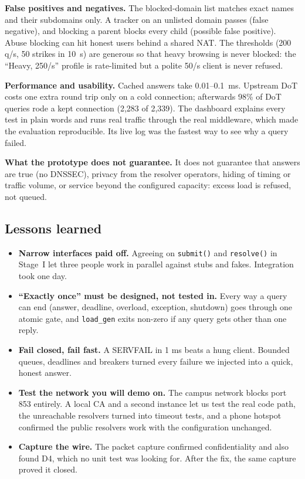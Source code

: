 \documentclass[11pt,a4paper]{article}
\newcommand{\code}[1]{\texttt{#1}}
\begin{document}
\textbf{False positives and negatives.} The blocked-domain list matches exact names and their subdomains only.
A tracker on an unlisted domain passes (false negative), and blocking a parent blocks every child (possible
false positive). Abuse blocking can hit honest users behind a shared NAT. The thresholds (200 q/s, 50 strikes
in 10~s) are generous so that heavy browsing is never blocked: the ``Heavy, 250/s'' profile is rate-limited
but a polite 50/s client is never refused.

\textbf{Performance and usability.} Cached answers take 0.01--0.1~ms. Upstream DoT costs one extra round trip
only on a cold connection; afterwards 98\% of DoT queries rode a kept connection (2{,}283 of 2{,}339). The
dashboard explains every test in plain words and runs real traffic through the real middleware, which made the
evaluation reproducible. Its live log was the fastest way to see why a query failed.

\textbf{What the prototype does not guarantee.} It does not guarantee that answers are true (no DNSSEC), privacy
from the resolver operators, hiding of timing or traffic volume, or service beyond the configured capacity:
excess load is refused, not queued.

\subsection{Lessons learned}
\begin{itemize}
  \item \textbf{Narrow interfaces paid off.} Agreeing on \code{submit()} and \code{resolve()} in Stage~I let
  three people work in parallel against stubs and fakes. Integration took one day.
  \item \textbf{``Exactly once'' must be designed, not tested in.} Every way a query can end (answer, deadline,
  overload, exception, shutdown) goes through one atomic gate, and \code{load\_gen} exits non-zero if any
  query gets other than one reply.
  \item \textbf{Fail closed, fail fast.} A SERVFAIL in 1 ms beats a hung client. Bounded queues, deadlines and
  breakers turned every failure we injected into a quick, honest answer.
  \item \textbf{Test the network you will demo on.} The campus network blocks port 853 entirely. A local CA and
  a second instance let us test the real code path, the unreachable resolvers turned into timeout tests, and
  a phone hotspot confirmed the public resolvers work with the configuration unchanged.
  \item \textbf{Capture the wire.} The packet capture confirmed confidentiality and also found D4, which no unit
  test was looking for. After the fix, the same capture proved it closed.
\end{itemize}
\end{document}
